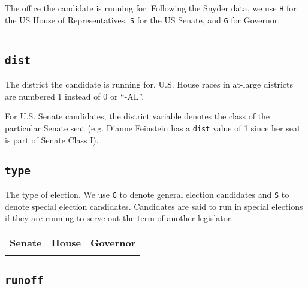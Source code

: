 \documentclass[12pt]{article}
\begin{document}
The office the candidate is running for. Following the Snyder data, we use \texttt{H} for the US House of Representatives, \texttt{S} for the US Senate, and \texttt{G} for Governor. 


    \begin{tabularx}{\linewidth}{C}
    
    \end{tabularx}

\subsection*{\texttt{dist}}

The district the candidate is running for. U.S. House races in at-large districts are numbered 1 instead of 0 or ``-AL''. 

 For U.S. Senate candidates, the district variable denotes the class of the particular Senate seat (e.g. Dianne Feinstein has a \texttt{dist} value of 1 since her seat is part of Senate Class I). 

\begin{table}[!h]
\centering
\footnotesize

\end{table}





\subsection*{\texttt{type}}

The type of election. We use \texttt{G} to denote general election candidates and \texttt{S} to denote special election candidates. Candidates are said to run in special elections if they are running to serve out the term of another legislator. 
\begin{table}[!h]
\begin{tabularx}{\linewidth}{CCC}
    \textbf{Senate} & \textbf{House} & \textbf{Governor}\\
     &  & 
\end{tabularx}
\end{table}

\FloatBarrier

\subsection*{\texttt{runoff}}
\end{document}
